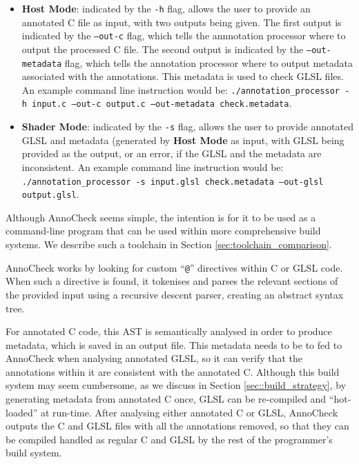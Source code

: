 \documentclass[a4paper,12pt,twoside,openright]{report}
\begin{document}
\begin{itemize}

    \item \textbf{Host Mode}: indicated by the \texttt{-h} flag, allows the
    user to provide an annotated C file as input, with two outputs being given.
    The first output is indicated by the \texttt{--out-c} flag, which tells the
    annnotation processor where to output the processed C file. The second
    output is indicated by the \texttt{--out-metadata} flag, which tells the
    annotation processor where to output metadata associated with the
    annotations. This metadata is used to check GLSL files. An example command
    line instruction would be: \texttt{./annotation\_processor -h input.c
    --out-c output.c --out-metadata check.metadata}.

    \item \textbf{Shader Mode}: indicated by the \texttt{-s} flag, allows the
    user to provide annotated GLSL and metadata (generated by \textbf{Host
    Mode} as input, with GLSL being provided as the output, or an error, if the
    GLSL and the metadata are inconsistent. An example command line instruction
    would be: \texttt{./annotation\_processor -s input.glsl check.metadata
    --out-glsl output.glsl}.

\end{itemize}

Although AnnoCheck seems simple, the intention is for it to be used as a
command-line program that can be used within more comprehensive build systems.
We describe such a toolchain in Section \ref{sec:toolchain_comparison}.

AnnoCheck works by looking for custom ``\texttt{@}'' directives within C or
GLSL code. When such a directive is found, it tokenises and parses the relevant
sections of the provided input using a recursive descent parser, creating an
abstract syntax tree.

For annotated C code, this AST is semantically analysed in order to produce
metadata, which is saved in an output file. This metadata needs to be to fed to
AnnoCheck when analysing annotated GLSL, so it can verify that the annotations
within it are consistent with the annotated C. Although this build system may
seem cumbersome, as we discuss in Section \ref{sec::build_strategy}, by
generating metadata from annotated C once, GLSL can be re-compiled and
``hot-loaded'' at run-time. After analysing either annotated C or GLSL,
AnnoCheck outputs the C and GLSL files with all the annotations removed, so
that they can be compiled handled as regular C and GLSL by the rest of the
programmer's build system.
\end{document}
